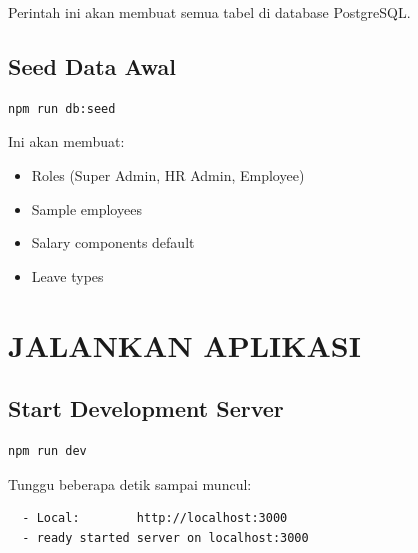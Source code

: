 \documentclass[12pt,a4paper]{article}
\begin{document}
Perintah ini akan membuat semua tabel di database PostgreSQL.

\subsection{Seed Data Awal}

\begin{lstlisting}[language=bash]
npm run db:seed
\end{lstlisting}

Ini akan membuat:
\begin{itemize}
    \item Roles (Super Admin, HR Admin, Employee)
    \item Sample employees
    \item Salary components default
    \item Leave types
\end{itemize}

\begin{center}
\end{center}

\newpage
\section{JALANKAN APLIKASI}

\subsection{Start Development Server}

\begin{lstlisting}[language=bash]
npm run dev
\end{lstlisting}

Tunggu beberapa detik sampai muncul:

\begin{verbatim}
  - Local:        http://localhost:3000
  - ready started server on localhost:3000
\end{verbatim}
\end{document}
